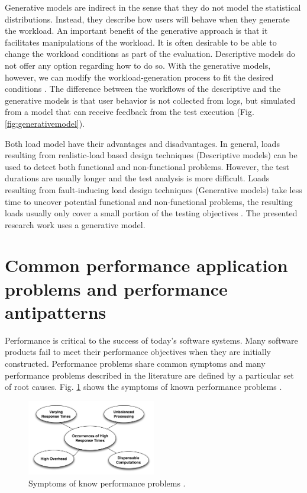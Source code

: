 \documentclass[times]{stvrauth}
\begin{document}
Generative models are indirect in the sense that they do not model the statistical distributions. Instead, they describe how users will behave when they generate the workload. An important benefit of the generative approach is that it facilitates manipulations of the workload. It is often desirable to be able to change the workload conditions as part of the evaluation. Descriptive models do not offer any option regarding how to do so. With the generative models, however, we can modify the workload-generation process to fit the desired conditions \cite{DiLucca2006}. The difference between the workflows of the descriptive and the generative models is that user behavior is not collected from logs, but simulated from a model that can receive feedback from the test execution (Fig. \ref{fig:generativemodel}).

Both load model have their advantages and disadvantages. In general, loads resulting from realistic-load based design techniques (Descriptive models) can be used to detect both functional and non-functional problems. However, the test durations are usually longer and the test analysis is more difficult. Loads resulting from fault-inducing load design techniques (Generative models) take less time to uncover potential functional and non-functional problems, the resulting loads usually only cover a small portion of the testing objectives \cite{Jiang2010}. The presented research work uses a generative model.



\section{Common performance application problems and performance antipatterns}

Performance is critical to the success of today’s software systems. Many software products fail to meet their performance objectives when they are initially constructed. Performance problems share common symptoms and many performance problems described in the literature are defined by a particular set of root causes. Fig. \ref{fig:symptoms}  shows the symptoms of known performance problems \cite{Wert2013a}. 



\begin{figure}[h]
\centering
\includegraphics[width=0.5\textwidth]{./images/symptoms.png}
\caption{Symptoms of know performance problems \cite{Wert2013a}. }
\label{fig:symptoms}
\end{figure}
\end{document}
